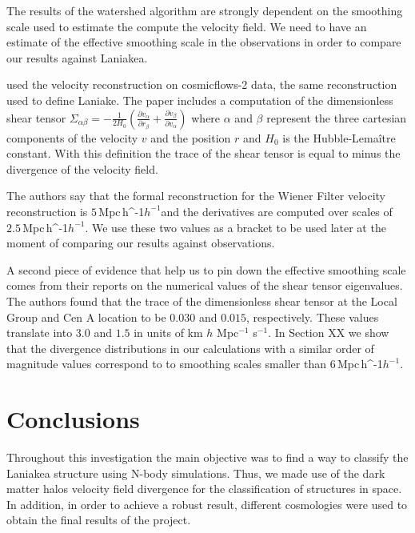 \documentclass[usenatbib]{mnras}
\newcommand{\Mpch}{\,{\rm Mpc}\,\ifmmode h^{-1}\else $h^{-1}$\fi}
\begin{document}
The results of the watershed algorithm are strongly dependent on the
smoothing scale used to estimate the compute the velocity field.
We need to have an estimate of the effective smoothing scale in the observations in order to compare our results against Laniakea.

\cite{2015MNRAS.452.1052L} used the velocity reconstruction on cosmicflows-2 data, the same reconstruction used to define Laniake.
The paper includes a computation of the dimensionless shear tensor $\Sigma_{\alpha\beta}=-\frac{1}{2H_0}\left(\frac{\partial v_\alpha}{\partial r_\beta}+\frac{\partial v_\beta}{\partial v_\alpha}\right)$ where $\alpha$ and $\beta$ represent the three cartesian components of the velocity $v$ and the position $r$ and $H_0$ is the Hubble-Lema\^itre constant.
With this definition the trace of the shear tensor is equal to minus the divergence of the velocity field.


The authors say that the formal reconstruction for the Wiener Filter velocity reconstruction is $5$\Mpch and the derivatives are computed over scales of $2.5$\Mpch. 
We use these two values as a bracket to be used later at the moment of comparing our results against observations.

A second piece of evidence that help us to pin down the effective smoothing scale comes from their reports on the numerical values of the shear tensor eigenvalues.
The authors found that the trace of the dimensionless shear tensor at the Local Group and Cen A location to be $0.030$ and $0.015$, respectively. 
These values translate into $3.0$ and $1.5$ in units of km $h$ Mpc$^{-1}$ s$^{-1}$. 
In Section XX we show that the divergence distributions in our calculations with a similar order of magnitude values correspond to 
to smoothing scales smaller than $6$\Mpch.





\section{Conclusions}
\label{sec:conclusions}


Throughout this investigation the main objective was to find a way to classify the Laniakea structure using N-body simulations. Thus, we made use of the dark matter halos velocity field divergence for the classification of structures in space. In addition, in order to achieve a robust result, different cosmologies were used to obtain the final results of the project.
\end{document}

